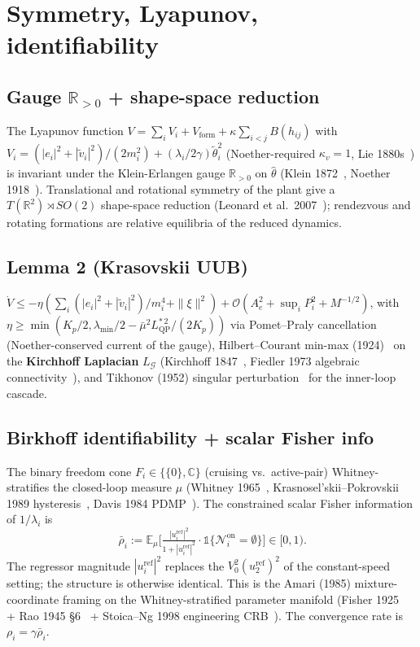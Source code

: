 \documentclass[letterpaper,10pt,conference]{IEEEtran}
\newcommand{\E}{\mathbb{E}}
\newcommand{\thethat}{\hat\theta}
\newcommand{\rhobar}{\bar\rho}
\begin{document}
\section{Symmetry, Lyapunov, identifiability}\label{sec:lyap}

\subsection{Gauge $\mathbb{R}_{>0}$ + shape-space reduction}
The Lyapunov function $V = \sum_i V_i + V_{\text{form}} + \kappa\sum_{i<j} B(h_{ij})$ with $V_i = (|e_i|^2 + |\tilde v_i|^2)/(2 m_i^2) + (\lambda_i/2\gamma)\tilde\theta_i^2$ (Noether-required $\kappa_v = 1$, Lie 1880s~\cite{lie1880s}) is invariant under the Klein-Erlangen gauge $\mathbb{R}_{>0}$ on $\thethat$ (Klein 1872~\cite{klein1872}, Noether 1918~\cite{noether1918}). Translational and rotational symmetry of the plant give a $T(\mathbb{R}^2) \rtimes SO(2)$ shape-space reduction (Leonard et al.\ 2007~\cite{leonardEtAl2007}); rendezvous and rotating formations are relative equilibria of the reduced dynamics.

\subsection{Lemma 2 (Krasovskii UUB)}
$\dot V \le -\eta(\sum_i (|e_i|^2 + |\tilde v_i|^2)/m_i^4 + \|\xi\|^2) + \mathcal{O}(A_e^2 + \sup_i P_i^2 + M^{-1/2})$, with $\eta \ge \min(K_p/2, \lambda_{\min}/2 - \bar\mu^2 L_{\text{QP}}^{*\,2}/(2 K_p))$ via Pomet--Praly cancellation (Noether-conserved current of the gauge), Hilbert--Courant min-max (1924)~\cite{hilbertCourant1924} on the \textbf{Kirchhoff Laplacian} $L_{\mathcal{G}}$ (Kirchhoff 1847~\cite{kirchhoff1847}, Fiedler 1973 algebraic connectivity~\cite{fiedler1973}), and Tikhonov (1952) singular perturbation~\cite{tikhonov1952} for the inner-loop cascade.

\subsection{Birkhoff identifiability + scalar Fisher info}
The binary freedom cone $F_i \in \{\{0\}, \mathbb{C}\}$ (cruising vs.\ active-pair) Whitney-stratifies the closed-loop measure $\mu$ (Whitney 1965~\cite{whitney1965}, Krasnosel'skii--Pokrovskii 1989 hysteresis~\cite{krasnoselskii1989}, Davis 1984 PDMP~\cite{davis1984}). The constrained scalar Fisher information of $1/\lambda_i$ is
\begin{equation}
\boxed{\,\rhobar_i := \E_\mu\!\Big[\tfrac{|u_i^{\text{ref}}|^2}{1 + |u_i^{\text{ref}}|^2}\cdot\mathbb{1}\{\mathcal{N}_i^{\text{on}} = \emptyset\}\Big] \in [0, 1).}
\label{eq:rhobar}
\end{equation}
The regressor magnitude $|u_i^{\text{ref}}|^2$ replaces the $V_0^2 (u_2^{\text{ref}})^2$ of the constant-speed setting; the structure is otherwise identical. This is the Amari (1985) mixture-coordinate framing on the Whitney-stratified parameter manifold (Fisher 1925~\cite{fisher1925} + Rao 1945 §6~\cite{rao1945} + Stoica--Ng 1998 engineering CRB~\cite{stoicaNg1998}). The convergence rate is $\rho_i = \gamma\rhobar_i$.
\end{document}
